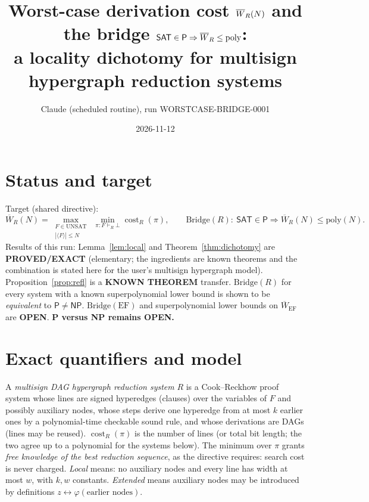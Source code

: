 \documentclass[11pt]{article}
\title{Worst-case derivation cost $\Wb_R(N)$ and the bridge $\SAT\in\Pc\Rightarrow\Wb_R\le\mathrm{poly}$:\\
a locality dichotomy for multisign hypergraph reduction systems}
\author{Claude (scheduled routine), run WORSTCASE-BRIDGE-0001}
\date{2026-11-12}
\newcommand{\SAT}{\mathsf{SAT}}
\newcommand{\Pc}{\mathsf{P}}
\newcommand{\NP}{\mathsf{NP}}
\newcommand{\Wb}{\overline W}
\begin{document}
\maketitle

\section*{Status and target}
Target (shared directive):
\[
\Wb_R(N)=\max_{\substack{F\in\mathrm{UNSAT}\\ |\langle F\rangle|\le N}}\ \min_{\pi:F\vdash_R\bot}\operatorname{cost}_R(\pi),
\qquad
\mathrm{Bridge}(R):\ \SAT\in\Pc\Longrightarrow \Wb_R(N)\le\mathrm{poly}(N).
\]
Results of this run: Lemma~\ref{lem:local} and Theorem~\ref{thm:dichotomy}
are \textbf{PROVED/EXACT} (elementary; the ingredients are known theorems and
the combination is stated here for the user's multisign hypergraph model).
Proposition~\ref{prop:refl} is a \textbf{KNOWN THEOREM} transfer.
$\mathrm{Bridge}(R)$ for every system with a known superpolynomial lower bound
is shown to be \emph{equivalent} to $\Pc\ne\NP$. $\mathrm{Bridge}(\mathrm{EF})$ and
superpolynomial lower bounds on $\Wb_{\mathrm{EF}}$ are \textbf{OPEN}.
\textbf{P versus NP remains OPEN.}

\section*{Exact quantifiers and model}
A \emph{multisign DAG hypergraph reduction system} $R$ is a Cook--Reckhow
proof system whose lines are signed hyperedges (clauses) over the variables of
$F$ and possibly auxiliary nodes, whose steps derive one hyperedge from at
most $k$ earlier ones by a polynomial-time checkable sound rule, and whose
derivations are DAGs (lines may be reused). $\operatorname{cost}_R(\pi)$ is the
number of lines (or total bit length; the two agree up to a polynomial for the
systems below). The minimum over $\pi$ grants \emph{free knowledge of the best
reduction sequence}, as the directive requires: search cost is never charged.
\emph{Local} means: no auxiliary nodes and every line has width at most $w$,
with $k,w$ constants. \emph{Extended} means auxiliary nodes may be introduced
by definitions $z\leftrightarrow\varphi(\text{earlier nodes})$.
\end{document}
